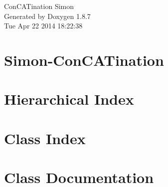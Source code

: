 \documentclass[twoside]{book}
\newcommand{\+}{\discretionary{\mbox{\scriptsize$\hookleftarrow$}}{}{}}
\newcommand{\clearemptydoublepage}{%
  \newpage{\pagestyle{empty}\cleardoublepage}%
}
\begin{document}
\hypersetup{pageanchor=false,
             bookmarks=true,
             bookmarksnumbered=true,
             pdfencoding=unicode
            }
\begin{titlepage}
\vspace*{7cm}
\begin{center}%
{\Large Con\+C\+A\+Tination Simon }\\
\vspace*{1cm}
{\large Generated by Doxygen 1.8.7}\\
\vspace*{0.5cm}
{\small Tue Apr 22 2014 18:22:38}\\
\end{center}
\end{titlepage}
\clearemptydoublepage
\tableofcontents
\clearemptydoublepage
{}
\hypersetup{pageanchor=true}

\chapter{Simon-\/\+Con\+C\+A\+Tination}
\label{md__r_e_a_d_m_e}
\hypertarget{md__r_e_a_d_m_e}{}

\chapter{Hierarchical Index}

\chapter{Class Index}

\chapter{Class Documentation}













































\newpage
{}
{}
\printindex
\end{document}
